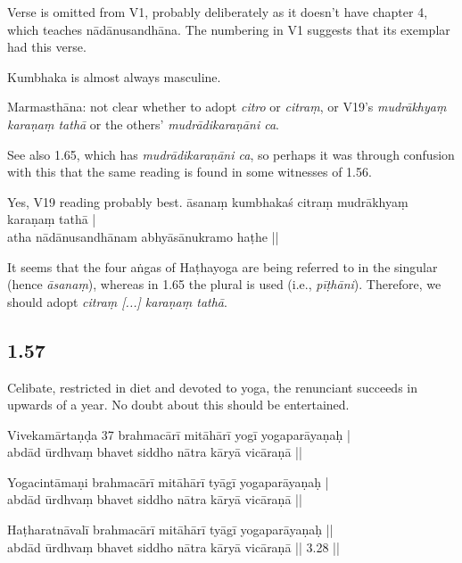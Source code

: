 \begin{ekdosis}
\begin{philcomm}[hp01_056]
Verse is omitted from V1, probably deliberately as it doesn’t have chapter 4, which teaches nādānusandhāna. The numbering in V1 suggests that its exemplar had this verse.

Kumbhaka is almost always masculine.

Marmasthāna: not clear whether to adopt \emph{citro} or \emph{citraṃ}, or V19’s \emph{mudrākhyaṃ karaṇaṃ tathā} or the others’ \emph{mudrādikaraṇāni ca}.

See also 1.65, which has \emph{mudrādikaraṇāni ca}, so perhaps it was through confusion with this that the same reading is found in some witnesses of 1.56.

Yes, V19 reading probably best.
\startverse
āsanaṃ kumbhakaś citraṃ mudrākhyaṃ karaṇaṃ tathā |\\
atha nādānusandhānam abhyāsānukramo haṭhe ||
\endverse

It seems that the four aṅgas of Haṭhayoga are being referred to in the singular (hence \emph{āsanaṃ}), whereas in 1.65 the plural is used (i.e., \emph{pīṭhāni}). Therefore, we should adopt \emph{citraṃ [...] karaṇaṃ tathā}.
\end{philcomm}

\subsection*{1.57}
\begin{translation}[hp01_057]
Celibate, restricted in diet and devoted to yoga, the renunciant succeeds in upwards of a year. No doubt about this should be entertained.
\end{translation}

\begin{sources}[hp01_057]
Vivekamārtaṇḍa 37
\startverse
brahmacārī mitāhārī yogī yogaparāyaṇaḥ |\\
abdād ūrdhvaṃ bhavet siddho nātra kāryā vicāraṇā ||
\endverse
\end{sources}

\begin{testimonia}[hp01_057]
Yogacintāmaṇi
\startverse
brahmacārī mitāhārī tyāgī yogaparāyaṇaḥ |\\
abdād ūrdhvaṃ bhavet siddho nātra kāryā vicāraṇā ||
\endverse

Haṭharatnāvalī
\startverse
brahmacārī mitāhārī tyāgī yogaparāyaṇaḥ ||\\
abdād ūrdhvaṃ bhavet siddho nātra kāryā vicāraṇā || 3.28 ||
\endverse
\end{testimonia}


\end{ekdosis}
